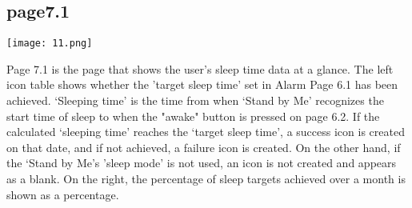 \documentclass[conference]{IEEEtran}
\begin{document}
\subsection{page7.1}
\centerline{\texttt{[image: 11.png]}}
Page 7.1 is the page that shows the user's sleep time data at a glance. The left icon table shows whether the 'target sleep time' set in Alarm Page 6.1 has been achieved. ‘Sleeping time’ is the time from when ‘Stand by Me’ recognizes the start time of sleep to when the "awake" button is pressed on page 6.2. If the calculated ‘sleeping time’ reaches the ‘target sleep time’, a success icon is created on that date, and if not achieved, a failure icon is created. On the other hand, if the ‘Stand by Me’s 'sleep mode' is not used, an icon is not created and appears as a blank. On the right, the percentage of sleep targets achieved over a month is shown as a percentage.
\end{document}
